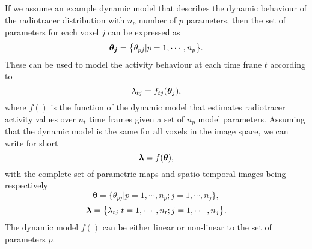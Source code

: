 If we assume an example dynamic model that describes the dynamic behaviour of the radiotracer distribution with $n_p$ number of $p$ parameters, then the set of parameters for each voxel $j$ can be expressed as
\begin{equation}
   \bm{\theta_j} = \big\{ {\theta_{pj}| p=1,\cdots,n_p} \big\} \\.
\end{equation}
These can be used to model the activity behaviour at each time frane $t$ according to
\begin{equation}
   \lambda_{tj} = f_{tj}(\bm\theta_{j}) \\,
\label{eqn:LinearDynamicModel}
\end{equation}
where $f()$ is the function of the dynamic model that estimates radiotracer activity values over $n_t$ time frames given a set of $n_{p}$ model parameters.
Assuming that the dynamic model is the same for all voxels in the image space, we can write for short 
\begin{equation}
\bm\lambda = f(\bm\theta) \\, 
\end{equation}
with the complete set of parametric maps and spatio-temporal images being respectively
\begin{equation}
   \bm{\theta} = \big\{ {{\theta}_{pj}|p=1,\cdots,n_p ; j=1,\cdots,n_j} \big\} , 
\end{equation}
\begin{equation}
   \bm{\lambda} = \big\{ {{\lambda}_{tj}|t=1,\cdots,n_t ; j=1,\cdots,n_j} \big\} \\. 
\end{equation}
The dynamic model $f()$ can be either linear or non-linear to the set of parameters $p$. 
